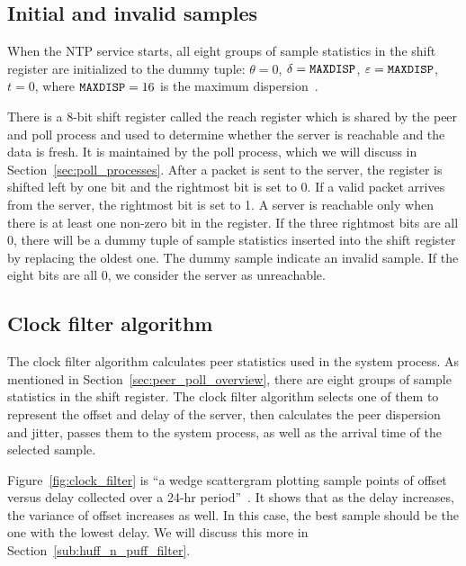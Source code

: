\subsection{Initial and invalid samples}%
\label{sub:initial_and_invalid_samples}
When the NTP service starts, all eight groups of sample statistics in the shift
register are initialized to the dummy tuple: $\theta = 0$, $\delta =
\verb|MAXDISP|$, $\varepsilon = \verb|MAXDISP|$, $t = 0$, where $\verb|MAXDISP|
= 16$ is the maximum dispersion~\cite{rfc5905}.

There is a 8-bit shift register called the reach register which is shared by
the peer
and poll process and used to determine whether the server is reachable and the
data is fresh. It is maintained by the poll process, which we will discuss in
Section~\ref{sec:poll_processes}. After a packet is sent to the server, the
register is shifted left by one bit and the rightmost bit is set to 0. If a
valid packet arrives from the server, the rightmost bit is set to 1. A
server is reachable only when there is at least one non-zero bit in the
register. If the three rightmost bits are all 0, there will be a dummy tuple of
sample statistics
inserted into the shift register by replacing the oldest one. The dummy sample
indicate an invalid sample. If the eight bits are all 0, we consider the
server as unreachable.

\subsection{Clock filter algorithm}%
\label{sub:clock_filter_algorithm}
The clock filter algorithm calculates peer statistics used in the system
process.  As mentioned in Section~\ref{sec:peer_poll_overview}, there are eight
groups of sample statistics in the shift register. The clock filter algorithm
selects one of them to represent the offset and delay of the server, then
calculates the peer dispersion and jitter, passes them to the system process,
as well as the arrival time of the selected sample.

Figure~\ref{fig:clock_filter} is ``a wedge scattergram plotting sample points
of offset versus delay collected over a 24-hr period''~\cite{clock_filter}. It
shows that as the delay increases, the variance of offset increases as
well. In this case, the best sample should be the one with the lowest delay. We
will discuss this more in Section~\ref{sub:huff_n_puff_filter}.




